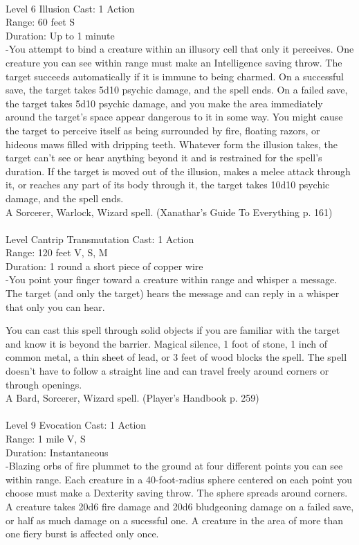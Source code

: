 \documentclass[10pt,twocolumn]{report}
\begin{document}
 \\
Level 6 \quad Illusion \quad Cast: 1 Action\\
Range: 60 feet \quad S\\
Duration: Up to 1 minute \quad \\
-You attempt to bind a creature within an illusory cell that only it perceives. One creature you can see within range must make an Intelligence saving throw. The target succeeds automatically if it is immune to being charmed. On a successful save, the target takes 5d10 psychic damage, and the spell ends. On a failed save, the target takes 5d10 psychic damage, and you make the area immediately around the target’s space appear dangerous to it in some way. You might cause the target to perceive itself as being surrounded by fire, floating razors, or hideous maws filled with dripping teeth. Whatever form the illusion takes, the target can’t see or hear anything beyond it and is restrained for the spell’s duration. If the target is moved out of the illusion, makes a melee attack through it, or reaches any part of its body through it, the target takes 10d10 psychic damage, and the spell ends.\\
A Sorcerer, Warlock, Wizard spell. (Xanathar's Guide To Everything p. 161) \\


 \\
Level Cantrip \quad Transmutation \quad Cast: 1 Action\\
Range: 120 feet \quad V, S, M\\
Duration: 1 round \quad a short piece of copper wire\\
-You point your finger toward a creature within range and whisper a message.
The target (and only the target) hears the message and can reply in a whisper that only you can hear.

You can cast this spell through solid objects if you are familiar with the target and know it is beyond the barrier. Magical silence, 1 foot of stone, 1 inch of common metal, a thin sheet of lead, or 3 feet of wood blocks the spell. The spell doesn’t have to follow a straight line and can travel freely around corners or through openings.\\
A Bard, Sorcerer, Wizard spell. (Player's Handbook p. 259) \\


 \\
Level 9 \quad Evocation \quad Cast: 1 Action\\
Range: 1 mile \quad V, S\\
Duration: Instantaneous \quad \\
-Blazing orbs of fire plummet to the ground at four different points you can see within range.
Each creature in a 40-foot-radius sphere centered on each point you choose must make a Dexterity saving throw. The sphere spreads around corners. A creature takes 20d6 fire damage and 20d6 bludgeoning damage on a failed save, or half as much damage on a sucessful one. A creature in the area of more than one fiery burst is affected only once.
\end{document}

